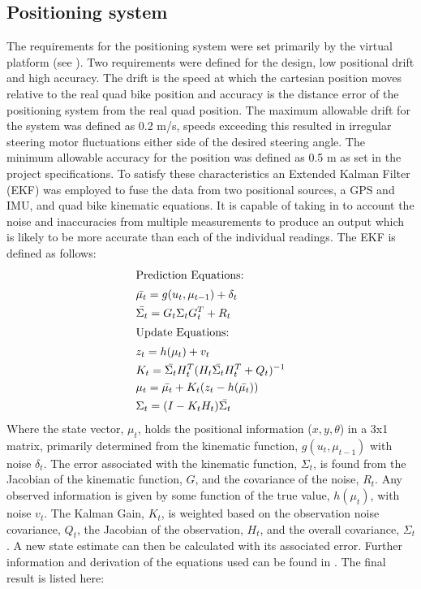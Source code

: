 \documentclass[main.tex]{subfiles}
\begin{document}
\subsection{Positioning system}
The requirements for the positioning system were set primarily by the virtual platform (see ). Two requirements were defined for the design, low positional drift and high accuracy. The drift is the speed at which the cartesian position moves relative to the real quad bike position and accuracy is the distance error of the positioning system from the real quad position. The maximum allowable drift for the system was defined as 0.2 m/s, speeds exceeding this resulted in irregular steering motor fluctuations either side of the desired steering angle. The minimum allowable accuracy for the position was defined as 0.5 m as set in the project specifications.
To satisfy these characteristics an Extended Kalman Filter (EKF) was employed to fuse the data from two positional sources, a GPS and IMU, and quad bike kinematic equations. It is capable of taking in to account the noise and inaccuracies from multiple measurements to produce an output which is likely to be more accurate than each of the individual readings. The EKF is defined as follows:
\begin{align}
\shortintertext{Prediction Equations:}
&\bar{\mu_t} = g(u_t, \mu_{t-1}) + \delta_t\\
&\bar{\Sigma_t} = G_t\Sigma_tG_t^T + R_t\\
\shortintertext{Update Equations:}
&z_t = h(\mu_t) + v_t\\
&K_t = \bar{\Sigma_t}H_t^T(H_t\bar{\Sigma_t}H_t^T + Q_t)^{-1}\\
&\mu_t = \bar{\mu_t} + K_t(z_t-h(\bar{\mu_t}))\\
&\Sigma_t = (I - K_tH_t)\bar{\Sigma_t}
\end{align}
Where the state vector, $\mu_t$, holds the positional information ($x, y, \theta$) in a 3x1 matrix, primarily determined from the kinematic function, $g(u_t, \mu_{t-1})$ with noise $\delta_t$. The error associated with the kinematic function, $\Sigma_t$, is found from the Jacobian of the kinematic function, $G$, and the covariance of the noise, $R_t$. Any observed information is given by some function of the true value, $h(\mu_t)$, with noise $v_t$. The Kalman Gain, $K_t$, is weighted based on the observation noise covariance, $Q_t$, the Jacobian of the observation, $H_t$, and the overall covariance, $\Sigma_t$. A new state estimate can then be calculated with its associated error. Further information and derivation of the equations used can be found in . The final result is listed here:
\end{document}
